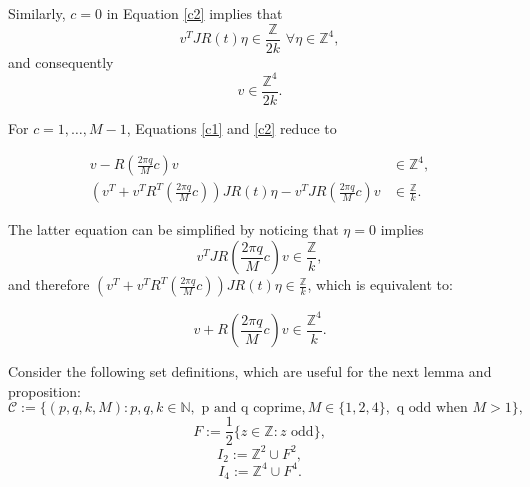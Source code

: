 \documentclass[12pt]{amsart}
\theoremstyle{plain}
\theoremstyle{definition}
\theoremstyle{remark}
\begin{document}
Similarly, \( c = 0 \) in Equation \eqref{c2} implies that 
\[ v^T J R(t) \eta \in \frac{\mathbb{Z}}{2k} \,\, \forall \eta \in \mathbb{Z}^4, \]     
and consequently 
\begin{equation}
    v \in \frac{\mathbb{Z}^4}{2k}. \label{cc2}
\end{equation}

For \( c = 1, \ldots, M-1 \), Equations \eqref{c1} and \eqref{c2} reduce to

\begin{align}
    v - R\left(\frac{2 \pi q}{M}c\right) v &\in \mathbb{Z}^4,  \label{ccc1} \\
    (v^T + v^T R^T\left(\frac{2 \pi q}{M}c\right)) J R(t) \eta - v^T J R\left(\frac{2 \pi q}{M}c\right) v  &\in \frac{\mathbb{Z}}{k}. \nonumber
\end{align}

The latter equation can be simplified by noticing that \( \eta = 0 \) implies 
\begin{equation}
    v^T J R\left(\frac{2 \pi q}{M}c\right)v \in \frac{\mathbb{Z}}{k}, \label{ccc2}
\end{equation}
and therefore \( (v^T + v^T R^T\left(\frac{2 \pi q}{M}c\right)) J R(t) \eta \in \frac{\mathbb{Z}}{k} \), 
which is equivalent to:

\begin{equation}
    v + R\left(\frac{2 \pi q}{M}c\right) v \in \frac{\mathbb{Z}^4}{k}. \label{ccc3}
\end{equation}

Consider the following set definitions, which are useful for the next lemma and proposition:
\[
\mathcal{C} := \{ (p,q,k,M): p,q,k \in \mathbb{N}, \text{ p and q coprime}, M \in \{ 1,2,4\}, \text{ q odd when } M > 1 \},
\]
\[
F := \frac{1}{2}\{ z \in \mathbb{Z} : z \text{ odd} \},
\]
\[
I_2 := \mathbb{Z}^2 \cup F^2,
\]
\[
I_4 := \mathbb{Z}^4 \cup F^4.
\]
\end{document}

